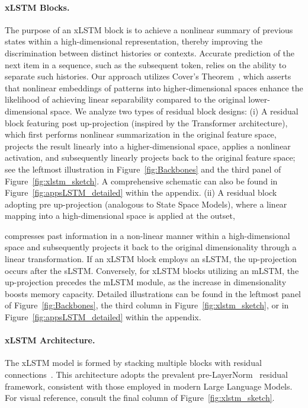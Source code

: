 \paragraph{xLSTM Blocks.}
\label{sec:xLSTMblock}
The purpose of an xLSTM block is to achieve a nonlinear summary of previous states within a high-dimensional representation, thereby improving the discrimination between distinct histories or contexts. Accurate prediction of the next item in a sequence, such as the subsequent token, relies on the ability to separate such histories. Our approach utilizes Cover’s Theorem~\citep{Cover:65}, which asserts that nonlinear embeddings of patterns into higher-dimensional spaces enhance the likelihood of achieving linear separability compared to the original lower-dimensional space. We analyze two types of residual block designs: (i) A residual block featuring post up-projection (inspired by the Transformer architecture), which first performs nonlinear summarization in the original feature space, projects the result linearly into a higher-dimensional space, applies a nonlinear activation, and subsequently linearly projects back to the original feature space; see the leftmost illustration in Figure~\ref{fig:Backbones} and the third panel of Figure~\ref{fig:xlstm_sketch}. A comprehensive schematic can also be found in Figure~\ref{fig:appsLSTM_detailed} within the appendix. (ii) A residual block adopting pre up-projection (analogous to State Space Models), where a linear mapping into a high-dimensional space is applied at the outset,

compresses past information in a non-linear manner within a high-dimensional space and subsequently projects it back to the original dimensionality through a linear transformation. If an xLSTM block employs an sLSTM, the up-projection occurs after the sLSTM. Conversely, for xLSTM blocks utilizing an mLSTM, the up-projection precedes the mLSTM module, as the increase in dimensionality boosts memory capacity. Detailed illustrations can be found in the leftmost panel of Figure~\ref{fig:Backbones}, the third column in Figure~\ref{fig:xlstm_sketch}, or in Figure~\ref{fig:appsLSTM_detailed} within the appendix.

\paragraph{xLSTM Architecture. }
\label{sec:xLSTMarchitecure}
The xLSTM model is formed by stacking multiple blocks with residual connections~\citep{Srivastava:15,He:16}. This architecture adopts the prevalent pre-LayerNorm~\citep{Ba:16b} residual framework, consistent with those employed in modern Large Language Models. For visual reference, consult the final column of Figure~\ref{fig:xlstm_sketch}.

